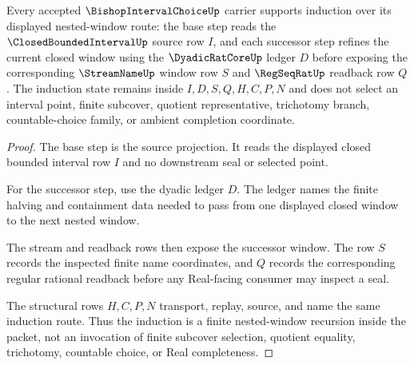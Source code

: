 \begin{theorem}
\label{thm:bishop-interval-choice-nested-window-induction}
Every accepted $\BishopIntervalChoiceUp$ carrier supports induction over its displayed nested-window route: the base step reads the $\ClosedBoundedIntervalUp$ source row $I$, and each successor step refines the current closed window using the $\DyadicRatCoreUp$ ledger $D$ before exposing the corresponding $\StreamNameUp$ window row $S$ and $\RegSeqRatUp$ readback row $Q$. The induction state remains inside $I,D,S,Q,H,C,P,N$ and does not select an interval point, finite subcover, quotient representative, trichotomy branch, countable-choice family, or ambient completion coordinate.
\end{theorem}
\begin{proof}
The base step is the source projection. It reads the displayed closed bounded interval row $I$ and no downstream seal or selected point.

For the successor step, use the dyadic ledger $D$. The ledger names the finite halving and containment data needed to pass from one displayed closed window to the next nested window.

The stream and readback rows then expose the successor window. The row $S$ records the inspected finite name coordinates, and $Q$ records the corresponding regular rational readback before any Real-facing consumer may inspect a seal.

The structural rows $H,C,P,N$ transport, replay, source, and name the same induction route. Thus the induction is a finite nested-window recursion inside the packet, not an invocation of finite subcover selection, quotient equality, trichotomy, countable choice, or Real completeness.
\end{proof}

